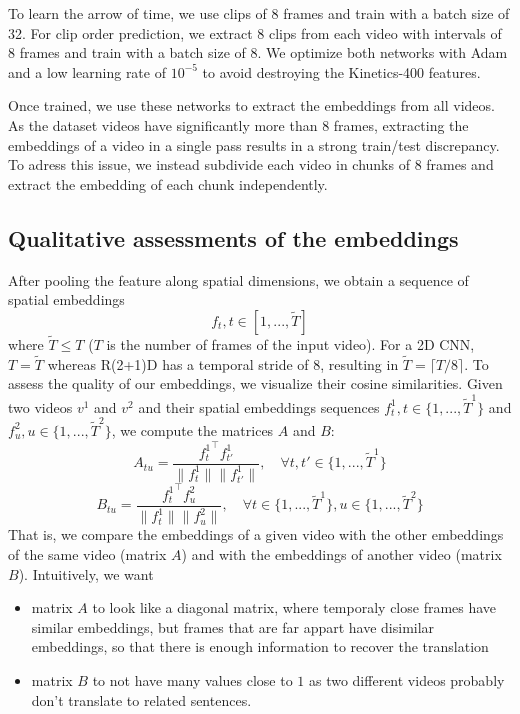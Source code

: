 \documentclass[final]{cvpr}
\begin{document}
To learn the arrow of time, we use clips of 8 frames and train with a batch size of 32. For clip order prediction, we extract 8 clips from each video with intervals of 8 frames and train with a batch size of 8. We optimize both networks with Adam and a low learning rate of $10^{-5}$ to avoid destroying the Kinetics-400 features.

Once trained, we use these networks to extract the embeddings from all videos. As the dataset videos have significantly more than 8 frames,  extracting the embeddings of a video in a single pass results in a strong train/test discrepancy. To adress this issue, we instead subdivide each video in chunks of 8 frames and extract the embedding of each chunk independently.
\subsection{Qualitative assessments of the embeddings}
After pooling the feature along spatial dimensions, we obtain a sequence of spatial embeddings
$$f_t, t\in[1, ..., \tilde{T}]$$
where $\tilde{T}\leq T$ ($T$ is the number of frames of the input video). For a 2D CNN, $T=\tilde{T}$ whereas R(2+1)D has a temporal stride of $8$, resulting in $\tilde{T} = \lceil T/8 \rceil$.
To assess the quality of our embeddings, we visualize their cosine similarities. Given two videos $v^1$ and $v^2$ and their spatial embeddings sequences $f_t^1, t\in\{1, ..., \tilde{T}^1\}$ and $f_u^2, u\in \{1, ...,  \tilde{T}^2\}$, we compute the matrices $A$ and $B$:
$$A_{tu} = \frac{{f_t^1}^\intercal f_{t'}^1}{\lVert f_t^1 \rVert \lVert f_{t'}^1 \rVert}, \quad\forall t, t' \in\{1, ..., \tilde{T}^1\}$$
$$B_{tu} = \frac{{f_t^1}^\intercal f_u^2}{\lVert f_t^1 \rVert \lVert f_u^2 \rVert}, \quad \forall t \in\{1, ..., \tilde{T}^1\}, u \in\{1, ..., \tilde{T}^2\}$$
That is, we compare the embeddings of a given video with the other embeddings of the same video (matrix $A$) and with the embeddings of another video (matrix $B$). Intuitively, we want 
\begin{itemize}
	\item matrix $A$ to look like a diagonal matrix, where temporaly close frames have similar embeddings, but frames that are far appart have disimilar embeddings, so that there is enough information to recover the translation
	\item matrix $B$ to not have many values close to $1$ as two different videos probably don't translate to related sentences.
\end{itemize}
\end{document}
